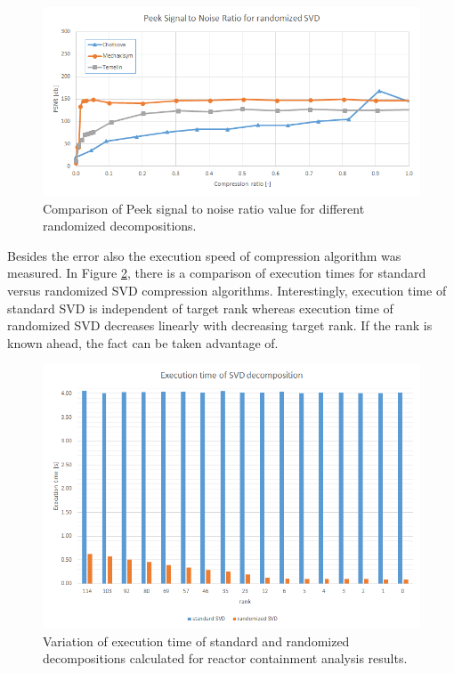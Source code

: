 \begin{figure}[H]
\centering\includegraphics[width=\textwidth]{figures/PSNR_rand}
\caption{Comparison of Peek signal to noise ratio value for different randomized decompositions.}
\label{fig:PSNR_rand}
\end{figure}

Besides the error also the execution speed of compression algorithm was measured. In Figure \ref{fig:temelin:ExeTime}, there is a comparison of execution times for standard versus randomized SVD compression algorithms. Interestingly, execution time of standard SVD is independent of target rank whereas execution time of randomized SVD decreases linearly with decreasing target rank. If the rank is known ahead, the fact can be taken advantage of.

\begin{figure}[H]
\centering\includegraphics[width=\textwidth]{figures/temelin_ExecutionTime}
\caption{Variation of execution time of standard and randomized decompositions calculated for reactor containment analysis results.}
\label{fig:temelin:ExeTime}
\end{figure}

